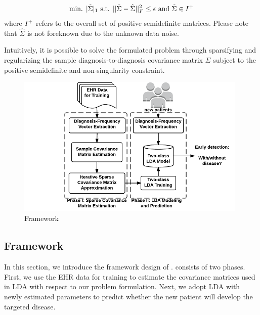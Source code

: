 \begin{equation}
\begin{aligned}
\text{min. }|\tilde{\Sigma}|_1 \text{ s.t. }||\tilde{\Sigma}-\hat{\Sigma}||_F^2\leq \epsilon\text{ and }\tilde{\Sigma}\in {\bf }I^+
\end{aligned}
\label{eq:problem}
\end{equation}
where ${\bf }I^+$ refers to the overall set of positive semidefinite matrices. 
Please note that $\hat{\Sigma}$ is not foreknown due to the unknown data noise. 

Intuitively, it is possible to solve the formulated problem through sparsifying and regularizing the sample diagnosis-to-diagnosis covariance matrix $\Sigma$ subject to the positive semidefinite and non-singularity constraint. 


\begin{figure}
\begin{center}
\includegraphics[width=0.98\textwidth]{./img/daehr.pdf}
\end{center}
\caption{\TheName{} Framework}
\end{figure}


\subsection{\TheName{} Framework}
In this section, we introduce the framework design of \TheName{}. 
\TheName{} consists of two phases.  
First, we use the EHR data for training to estimate the covariance matrices used in LDA with respect to our problem formulation. 
Next, we adopt LDA with newly estimated parameters to predict whether the new patient will develop the targeted disease.

